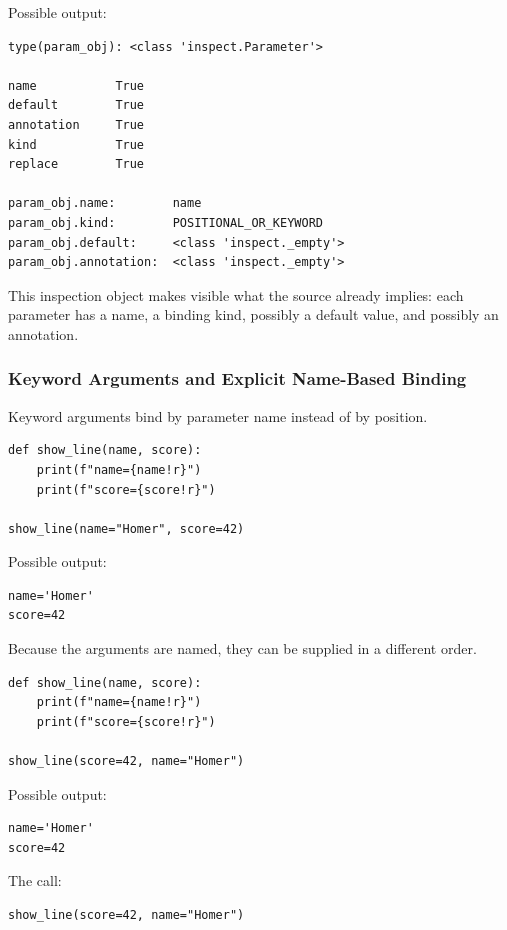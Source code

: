 Possible output:

\begin{verbatim}
type(param_obj): <class 'inspect.Parameter'>

name           True
default        True
annotation     True
kind           True
replace        True

param_obj.name:        name
param_obj.kind:        POSITIONAL_OR_KEYWORD
param_obj.default:     <class 'inspect._empty'>
param_obj.annotation:  <class 'inspect._empty'>
\end{verbatim}

This inspection object makes visible what the source already implies: each parameter has a name, a binding kind, possibly a default value, and possibly an annotation.

\subsubsection{Keyword Arguments and Explicit Name-Based Binding}

Keyword arguments bind by parameter name instead of by position.

\begin{verbatim}
def show_line(name, score):
    print(f"name={name!r}")
    print(f"score={score!r}")

show_line(name="Homer", score=42)
\end{verbatim}

Possible output:

\begin{verbatim}
name='Homer'
score=42
\end{verbatim}

Because the arguments are named, they can be supplied in a different order.

\begin{verbatim}
def show_line(name, score):
    print(f"name={name!r}")
    print(f"score={score!r}")

show_line(score=42, name="Homer")
\end{verbatim}

Possible output:

\begin{verbatim}
name='Homer'
score=42
\end{verbatim}

The call:

\begin{verbatim}
show_line(score=42, name="Homer")
\end{verbatim}


